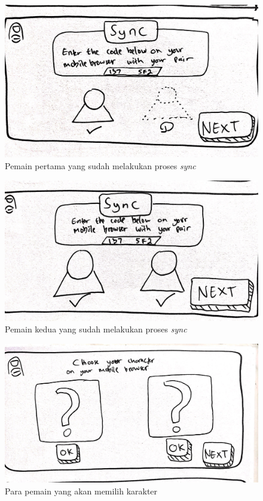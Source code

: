 \documentclass[a4paper,twoside]{article}
\begin{document}
\begin{enumerate}
		\begin{figure}[H]
			\centering
			\includegraphics[scale=0.1]{Gambar/web3_sync2}
			\caption{Pemain pertama yang sudah melakukan proses \textit{sync}}
			\label{fig:3_web3_sync2}
		\end{figure}
	
		\begin{figure}[H]
			\centering
			\includegraphics[scale=0.1]{Gambar/web4_sync3}
			\caption{Pemain kedua yang sudah melakukan proses \textit{sync}}
			\label{fig:4_web4_sync3}
		\end{figure}
	
		\begin{figure}[H]
			\centering
			\includegraphics[scale=0.1]{Gambar/web5_char1}
			\caption{Para pemain yang akan memilih karakter}
			\label{fig:5_web5_char1}
		\end{figure}
	

\end{enumerate}
\end{document}
